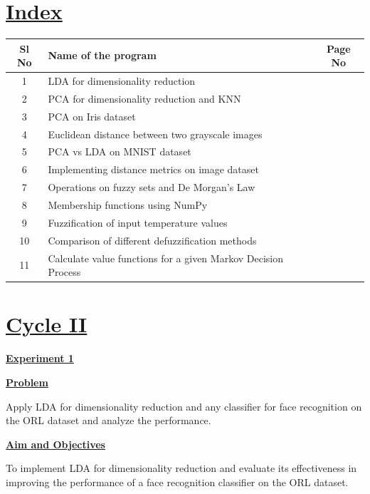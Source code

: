 \documentclass[a4paper,12pt]{article}
\begin{document}
\section*{\underline{Index}}
\begin{longtable}{|c|p{11cm}|c|} 
\hline
\textbf{Sl No} & \textbf{Name of the program} & \textbf{Page No} \\
\hline
1 & LDA for dimensionality reduction & \pageref{exp1} \\
\hline
2 & PCA for dimensionality reduction and KNN & \pageref{exp2} \\
\hline
3 & PCA on Iris dataset & \pageref{exp3} \\
\hline
4 & Euclidean distance between two grayscale images & \pageref{exp4} \\
\hline
5 & PCA vs LDA on MNIST dataset & \pageref{exp5} \\
\hline
6 & Implementing distance metrics on image dataset & \pageref{exp6} \\ 
\hline
7 & Operations on fuzzy sets and De Morgan's Law & \pageref{exp7} \\
\hline
8 & Membership functions using NumPy & \pageref{exp8} \\
\hline
9 & Fuzzification of input temperature values & \pageref{exp9} \\
\hline
10 & Comparison of different defuzzification methods & \pageref{exp10} \\
\hline
11 & Calculate value functions for a given Markov Decision Process & \pageref{exp11} \\
\hline
\end{longtable}
\newpage

\section*{\underline{Cycle II}}
\begin{center}
\textbf{\underline{Experiment 1}}
\label{exp1}

\end{center}

\vspace{1em}
\noindent
\textbf{\underline{Problem}}\par
\noindent
Apply LDA for dimensionality reduction and any classifier for face recognition on the ORL dataset and analyze the performance.\par


\vspace{1em}
\noindent
\textbf{\underline{Aim and Objectives}}\par
\noindent
To implement LDA for dimensionality reduction and evaluate its effectiveness in improving the performance of a face recognition classifier on the ORL dataset.
\end{document}
